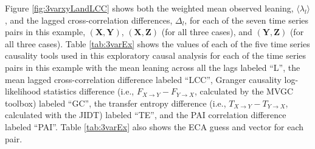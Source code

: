 \documentclass{article}[10pt]
\begin{document}
Figure \ref{fig:3varxyLandLCC} shows both the weighted mean observed leaning, $\langle \lambda_l\rangle$, and the lagged cross-correlation differences, $\Delta_l$, for each of the seven time series pairs in this example, $(\mathbf{X},\mathbf{Y})$, $(\mathbf{X},\mathbf{Z})$ (for all three cases), and $(\mathbf{Y},\mathbf{Z})$ (for all three cases).  Table \ref{tab:3varEx} shows the values of each of the five time series causality tools used in this exploratory causal analysis for each of the time series pairs in this example with the mean leaning across all the lags labeled ``L'', the mean lagged cross-correlation difference labeled ``LCC'', Granger causality log-likelihood statistics difference (i.e., $F_{X\rightarrow Y}-F_{Y\rightarrow X}$, calculated by the MVGC toolbox) labeled ``GC'', the transfer entropy difference (i.e., $T_{X\rightarrow Y}-T_{Y\rightarrow X}$, calculated with the JIDT) labeled ``TE'', and the PAI correlation difference labeled ``PAI''.  Table \ref{tab:3varEx} also shows the ECA guess and vector for each pair.
\end{document}
